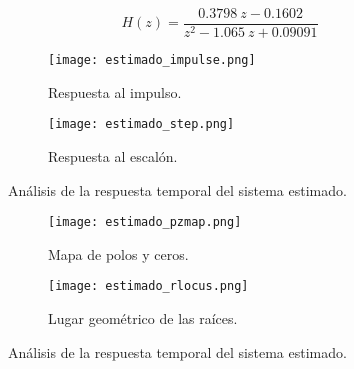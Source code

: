 \vspace{-0.5cm}
\begin{equation}
    H(z) = \dfrac{0.3798\ z - 0.1602}{z^2 - 1.065\ z + 0.09091}
\end{equation}
\vspace{-0.5cm}

\begin{figure}[H]
    \centering

    \begin{subfigure}[b]{0.49\textwidth}
        \centering
        \texttt{[image: estimado\_impulse.png]}
        \caption{Respuesta al impulso.}
        \label{fig:estimado_impulse}
    \end{subfigure}
    \begin{subfigure}[b]{0.49\textwidth}
        \centering
        \texttt{[image: estimado\_step.png]}
        \caption{Respuesta al escalón.}
        \label{fig:estimado_step}
    \end{subfigure}

    \vspace{-0.25cm}
    \caption{Análisis de la respuesta temporal del sistema estimado.}
    \label{fig:estimado_respuestas}
\end{figure}
\vspace{-0.5cm}

\begin{figure}[H]
    \centering

    \begin{subfigure}[b]{0.49\textwidth}
        \centering
        \texttt{[image: estimado\_pzmap.png]}
        \caption{Mapa de polos y ceros.}
        \label{fig:estimado_pzmap}
    \end{subfigure}
    \begin{subfigure}[b]{0.49\textwidth}
        \centering
        \texttt{[image: estimado\_rlocus.png]}
        \caption{Lugar geométrico de las raíces.}
        \label{fig:estimado_rlocus}
    \end{subfigure}

    \vspace{-0.25cm}
    \caption{Análisis de la respuesta temporal del sistema estimado.}
    \label{fig:estimado_estabilidad}
\end{figure}
\vspace{-0.5cm}


